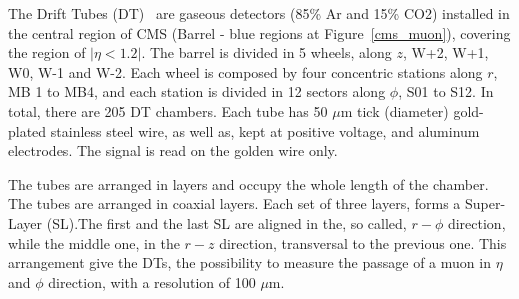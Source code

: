 The Drift Tubes (DT)~\cite{Teyssier:2015xjj} are gaseous detectors (85\% Ar and 15\% CO2) installed in the central region of CMS (Barrel - blue regions at Figure~\ref{cms_muon}), covering the region of $|\eta < 1.2|$. The barrel is divided in 5 wheels, along $z$, W+2, W+1, W0, W-1 and W-2. Each wheel is composed by four concentric stations along $r$, MB 1 to MB4, and each station is divided in 12 sectors along $\phi$, S01 to S12. In total, there are 205 DT chambers. Each tube has 50 $\mu$m tick (diameter) gold-plated stainless steel wire, as well as, kept at positive voltage, and aluminum electrodes. The signal is read on the golden wire only.

The tubes are arranged in layers and occupy the whole length of the chamber. The tubes are arranged in coaxial layers. Each set of three layers, forms a Super-Layer (SL).The first and the last SL are aligned in the, so called, $r-\phi$ direction, while the middle one, in the $r-z$ direction, transversal to the previous one. This arrangement give the DTs, the possibility to measure the passage of a muon in $\eta$ and $\phi$ direction, with a resolution of 100 $\mu$m.

